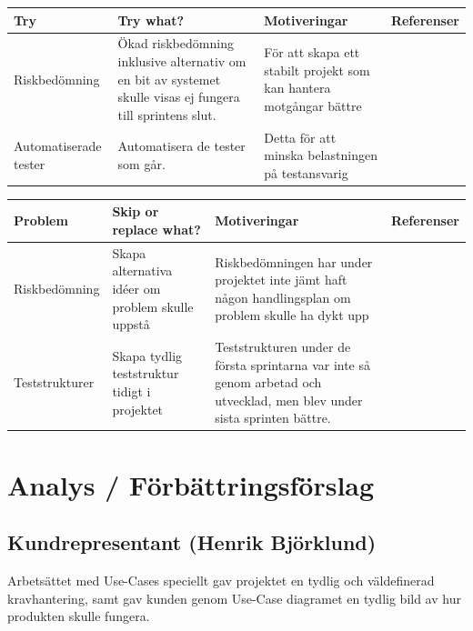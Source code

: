 \documentclass[conference,a4paper]{IEEEtran}
\newcommand\Tstrut{\rule{0pt}{2.6ex}}       %
\newcommand\Bstrut{\rule[-0.9ex]{0pt}{0pt}} %
\newcommand{\TBstrut}{\Tstrut\Bstrut} %
\begin{document}
\begin{table}[H]
	\small
  \centering
	\begin{tabular}{|p{1.9cm}|p{2cm}|p{1.7cm}|p{1.2cm}|} %
    \hline
    Try & Try what? & Motiveringar & Referenser \TBstrut \\
    \hline
    Riskbedömning & Ökad riskbedömning inklusive alternativ om en bit av systemet skulle visas ej fungera till sprintens slut. & För att skapa ett stabilt projekt som kan hantera motgångar bättre& \TBstrut \\
    \hline
    Automatiserade tester & Automatisera de tester som går. & Detta för att minska belastningen på testansvarig& \TBstrut \\
    \hline

  \end{tabular}
\end{table}

\begin{table}[H]
	\small
  \centering
	\begin{tabular}{|p{1.9cm}|p{1.7cm}|p{2.2cm}|p{1.2cm}|} %
    \hline
    Problem & Skip or replace what? & Motiveringar & Referenser \TBstrut \\
    \hline
    Riskbedömning & Skapa alternativa idéer om problem skulle uppstå &  Riskbedömningen har under projektet inte jämt haft någon handlingsplan om problem skulle ha dykt upp& \TBstrut \\
    \hline
    Teststrukturer &Skapa tydlig teststruktur tidigt i projektet &Teststrukturen under de första sprintarna var inte så genom arbetad och utvecklad, men blev under sista sprinten bättre.  & \TBstrut \\
    \hline

  \end{tabular}
\end{table}

\section{Analys / Förbättringsförslag} \label{sec:analys}

\subsection{Kundrepresentant (Henrik Björklund)}
Arbetsättet med Use-Cases speciellt gav projektet en tydlig och väldefinerad kravhantering, samt gav kunden genom Use-Case diagramet en tydlig bild av hur produkten skulle fungera.
\end{document}
